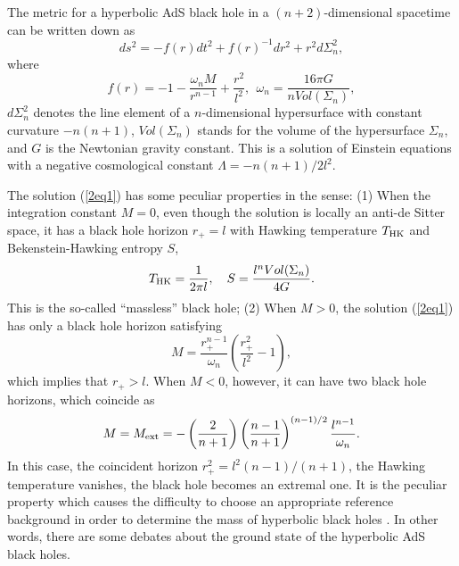 \documentclass[a4paper,12pt]{article}
\begin{document}
The metric for a hyperbolic AdS black hole in a $(n+2)$-dimensional spacetime
can be written down as \cite{Birm}
\begin{equation}
\label{2eq1}
ds^2 = -f(r)dt^2 +f(r)^{-1}dr^2 +r^2 d\Sigma^2_n,
\end{equation}
where
\begin{equation}
f(r) =-1 -\frac{\omega_n M}{r^{n-1}} +\frac{r^2}{l^2}, \ \  
\omega_n=\frac{16\pi G}{n Vol(\Sigma_n)},
\end{equation}
$d\Sigma_n^2$ denotes the line element of a $n$-dimensional hypersurface
with constant curvature $-n(n+1)$,  $Vol(\Sigma_n)$ stands for the volume
of the hypersurface $\Sigma_n$, and $G$ is the Newtonian gravity constant.
This is a solution of Einstein equations with a negative cosmological 
constant $\Lambda = -n(n+1)/2l^2$. 
 
The solution (\ref{2eq1}) has some peculiar properties in the sense: 
(1) When the integration constant $M=0$, even though the solution
is locally an anti-de Sitter space, it has a black hole horizon $r_+=l$
with Hawking temperature $T_{\rm HK}$ and Bekenstein-Hawking entropy $S$, 
\begin{equation}
\label{2eq3}
T_{\rm HK}= \frac{1}{2\pi l}, \ \ \  S =\frac{l^n Vol(\Sigma_n)}{4G}.
\end{equation}
This is the so-called ``massless'' black hole;  (2) When $M >0$, the solution
(\ref{2eq1}) has only a black hole horizon satisfying
\begin{equation}
\label{2eq4}
M =\frac{r_+^{n-1}}{\omega_n}\left (\frac{r_+^2}{l^2}-1\right ),
\end{equation}
which implies that $r_+ >l$.  When $M <0$, however, it can have two black hole
horizons, which coincide as 
\begin{equation}
\label{2eq5}
M =M_{\rm ext}= -\left (\frac{2}{n+1}\right)
   \left (\frac{n-1}{n+1}\right)^{(n-1)/2} \frac{l^{n-1}}{\omega_n}.
\end{equation}
In this case, the coincident horizon $r_+^2=l^2(n-1)/(n+1)$, the Hawking
temperature vanishes, the black hole becomes an extremal one. It is the
peculiar property which causes the difficulty to choose an appropriate 
reference background in order to determine
the mass of hyperbolic black holes \cite{Birm,Emp}. In other words, there 
are some debates about the ground state of the hyperbolic AdS black holes.
\end{document}

